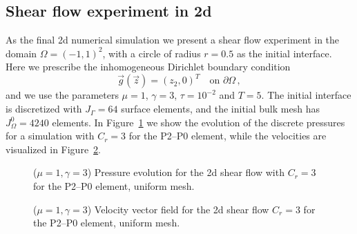 \documentclass[a4paper,12pt,onecolumn]{article}
\begin{document}
\subsection{Shear flow experiment in 2d}
As the final 2d numerical simulation we present a shear flow experiment
in the domain $\Omega=(-1,1)^2$, with a circle of radius $r=0.5$ as the 
initial interface. Here we prescribe the inhomogeneous Dirichlet boundary 
condition
\begin{equation*}
\vec g(\vec z)=(z_2,0)^T\quad \mbox{on }\partial\Omega\,,
\end{equation*}
and we use the parameters $\mu=1$, $\gamma=3$, $\tau=10^{-2}$ and $T=5$. 
The initial interface is discretized with $J_\Gamma = 64$ surface elements, 
and the initial bulk mesh has $J_\Omega^0 = 4240$ elements. In 
Figure~\ref{fig:shear_2d} we show the evolution of the discrete pressures
for a simulation with $C_r=3$ for the P2--P0 element, while the velocities
are visualized in Figure~\ref{fig:shear_2d_velocity}.
\begin{figure}[htbp]
\centering
{}
\caption{($\mu=1,\gamma=3$) Pressure evolution for the 2d shear flow with 
$C_r=3$ for the P2--P0 element, uniform mesh.}
\label{fig:shear_2d}
\end{figure}

\begin{figure}[htbp]
\centering
{}
\caption{($\mu=1,\gamma=3$) Velocity vector field for the 2d shear flow 
$C_r=3$ for the P2--P0 element, uniform mesh.}
\label{fig:shear_2d_velocity}
\end{figure}
\end{document}
